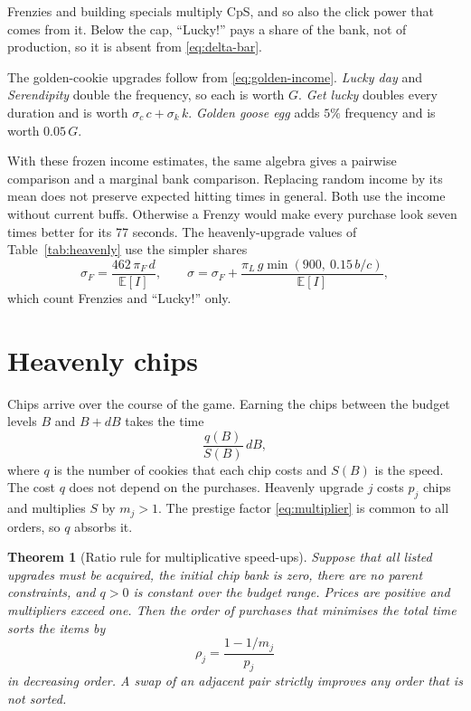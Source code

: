 \documentclass[11pt,a4paper]{article}
\numberwithin{equation}{section}
\newtheorem{theorem}{Theorem}[section]
\theoremstyle{definition}
\theoremstyle{remark}
\newcommand{\E}{\mathbb E}
\newcommand{\Lucky}{\textup{``Lucky!''}}
\begin{document}
Frenzies and building specials multiply CpS, and so also the click power that comes from it. Below the cap, \Lucky{} pays a share of the bank, not of production, so it is absent from \eqref{eq:delta-bar}.

The golden-cookie upgrades follow from \eqref{eq:golden-income}. \emph{Lucky day} and \emph{Serendipity} double the frequency, so each is worth $G$. \emph{Get lucky} doubles every duration and is worth $\sigma_c\,c+\sigma_k\,k$. \emph{Golden goose egg} adds $5\%$ frequency and is worth $0.05\,G$.

With these frozen income estimates, the same algebra gives a pairwise comparison and a marginal bank comparison. Replacing random income by its mean does not preserve expected hitting times in general. Both use the income without current buffs. Otherwise a Frenzy would make every purchase look seven times better for its 77 seconds. The heavenly-upgrade values of Table~\ref{tab:heavenly} use the simpler shares
\begin{equation}\label{eq:sigma-simple}
 \sigma_F=\frac{462\,\pi_F\,d}{\E[I]},\qquad\sigma=\sigma_F+\frac{\pi_L\,g\min(900,\ 0.15\,b/c)}{\E[I]},
\end{equation}
which count Frenzies and \Lucky{} only.

\section{Heavenly chips}\label{sec:chips}
Chips arrive over the course of the game. Earning the chips between the budget levels $B$ and $B+dB$ takes the time
\[
 \frac{q(B)}{S(B)}\,dB,
\]
where $q$ is the number of cookies that each chip costs and $S(B)$ is the speed. The cost $q$ does not depend on the purchases. Heavenly upgrade $j$ costs $p_j$ chips and multiplies $S$ by $m_j>1$. The prestige factor \eqref{eq:multiplier} is common to all orders, so $q$ absorbs it.

\begin{theorem}[Ratio rule for multiplicative speed-ups]\label{thm:smith}
Suppose that all listed upgrades must be acquired, the initial chip bank is zero, there are no parent constraints, and $q>0$ is constant over the budget range. Prices are positive and multipliers exceed one. Then the order of purchases that minimises the total time sorts the items by
\begin{equation}\label{eq:ratio}
 \rho_j=\frac{1-1/m_j}{p_j}
\end{equation}
in decreasing order. A swap of an adjacent pair strictly improves any order that is not sorted.
\end{theorem}
\end{document}
